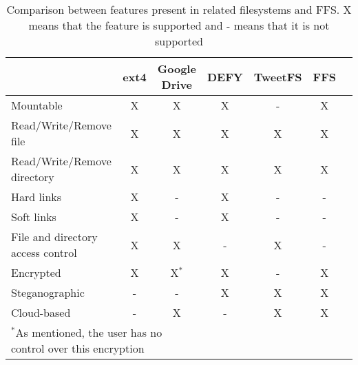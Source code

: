 \begin{table}[!ht]
	\begin{center}
		\caption{Comparison between features present in related filesystems and FFS. X means that the feature is supported and - means that it is not supported}
		\begin{tabular}{ l || c | c | c | c | c | c }
			
			\hline
\hspace{1mm} 						& \textbf{ext4} 	& \textbf{Google Drive} & \textbf{DEFY} 	& \textbf{TweetFS} 	& \textbf{FFS}\\
			
			\hline
			\hline
			
Mountable							& 	X 				& 	X					& 	X 				& 	-				& 	X\\
Read/Write/Remove file				& 	X 				& 	X					& 	X 				& 	X				& 	X\\
Read/Write/Remove directory 		& 	X 				& 	X					& 	X 				& 	X				& 	X\\
Hard links 							& 	X 				& 	-					& 	X 				& 	-				& 	-\\
Soft links 							& 	X 				& 	-					& 	X 				& 	-				& 	-\\
File and directory access control 	& 	X 				& 	X					& 	- 				& 	X				& 	-\\

Encrypted							&	X				&	X$^{*}$				&	X				&	-				&	X\\
Steganographic						&	-				&	-					&	X				&	X				&	X\\
Cloud-based							&	-				&	X					&	-				&	X				&	X\\

			\hline		

		\multicolumn{3}{l}{$^{*}$\footnotesize{As mentioned, the user has no control over this encryption}} \\

		\end{tabular}
		\label{tbl:fs_comp}
	\end{center}

\end{table}
